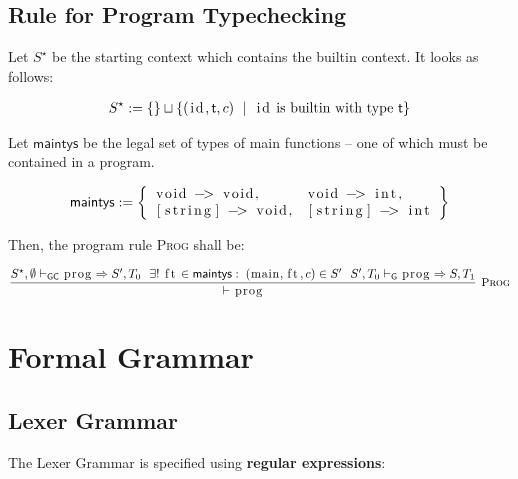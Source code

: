 \documentclass{article}
\newcommand{\code}[1]{\lstinline[columns=fixed]{#1}}
\newcommand{\drmrule}[5]{\frac{#1}{#2\vdash_{\mathsf{#3}}#4}\textsc{\ \small{#5}}}
\newcommand{\ruleapp}[1]{\vdash_{\mathsf{#1}}}
\newcommand{\mc}[1]{\textnormal{\code{#1}}}
\begin{document}
		\subsection{Rule for Program Typechecking}
		
			Let $S^\star$ be the starting context which contains the builtin context. It looks as follows:
			
			\begin{align*}
				S^\star := \{\}\sqcup \left\{ (\mc{id}, \mathsf{t}, c) \ \mid\ \mc{id}\textnormal{ is builtin with type \textsf{t}} \right\}
			\end{align*}
			
			Let $\mathsf{maintys}$ be the legal set of types of main functions -- one of which must be contained in a program.
			
			\begin{align*}
				\mathsf{maintys} := \left\{
					\begin{array}{ll}
						\mc{void -> void}, & \mc{void -> int},\\
						\mc{[string] -> void}, & \mc{[string] -> int}
					\end{array}
				\right\}
			\end{align*}
		
			Then, the program rule \textsc{Prog} shall be:
		
			\begin{align*}
				\drmrule{S^\star,\emptyset \ruleapp{GC} \mc{prog} \Rightarrow S',T_0 \ \ \exists!\; \mc{ft}\in\mathsf{maintys}:\;(\mc{main},\mc{ft},c)\in S'\ \ S',T_0 \ruleapp{G} \mc{prog} \Rightarrow S,T_1}{}{}{\mc{prog}}{Prog}
			\end{align*}
		
	\section{Formal Grammar}
	
		\subsection{Lexer Grammar}
		
			The Lexer Grammar is specified using \textbf{regular expressions}:
			
\end{document}
